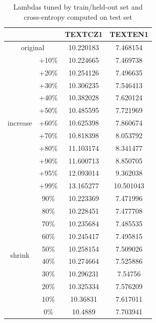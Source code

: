 \documentclass{article}
\begin{document}
\begin{table}[h]
    \centering
    \begin{tabular}{|c|c|c|c|} 
        \hline
        \multicolumn{2}{|c|}{} & TEXTCZ1 & TEXTEN1 \\
        \hline
        \multicolumn{2}{|c|}{original} & 10.220183 & 7.468154 \\
        \hline
        \multirow{11}{5em}{increase} & +10\% & 10.224665 & 7.469738 \\
         & +20\% & 10.254126 & 7.496635 \\
         & +30\% & 10.306235 & 7.546413 \\
         & +40\% & 10.382028 & 7.620124 \\
         & +50\% & 10.485595 & 7.721969 \\
         & +60\% & 10.625398 & 7.860674 \\
         & +70\% & 10.818398 & 8.053792 \\
         & +80\% & 11.103174 & 8.341477 \\
         & +90\% & 11.600713 & 8.850705 \\
         & +95\% & 12.093014 & 9.362038 \\
         & +99\% & 13.165277 & 10.501043 \\
        \hline
        \multirow{11}{5em}{shrink} & 90\% & 10.223369 & 7.471996 \\
         & 80\% & 10.228451 & 7.477708 \\
         & 70\% & 10.235684 & 7.485535 \\
         & 60\% & 10.245417 & 7.495815 \\
         & 50\% & 10.258154 & 7.509026 \\
         & 40\% & 10.274664 & 7.525886 \\
         & 30\% & 10.296231 & 7.54756 \\
         & 20\% & 10.325334 & 7.576209 \\
         & 10\% & 10.36831 & 7.617011 \\
         & 0\% & 10.4889 & 7.703941 \\
        \hline
    \end{tabular}
    \caption{Lambdas tuned by train/held-out set and cross-entropy computed on test set}
    \label{table:task2-tweaking}
\end{table}
\end{document}
